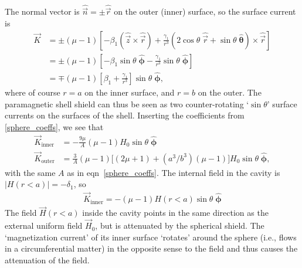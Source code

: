 The normal vector is $\hat{\vec n}=\pm\hat{\vec r}$ on the outer (inner)
surface, so the surface current is
%
\begin{align*}
   \vec K&=\pm(\mu-1)\left[-\beta_1\left(\hat{\vec z}\times\hat{\vec
   r}\right)+\frac{\gamma_1}{r^3}\left(2\cos\theta\;\hat{\vec
   r}+\sin\theta\;\hat{\boldsymbol\theta}\right)\times\hat{\vec r}\right]\\
   &=\pm(\mu-1)\left[-\beta_1\sin\theta\;\hat{\boldsymbol\phi}-\frac{\gamma_1}{r^3}\sin\theta\;\hat{\boldsymbol\phi}\right]\\
   &=\mp(\mu-1)\left[\beta_1+\frac{\gamma_1}{r^3}\right]\sin\theta\;\hat{\boldsymbol\phi},
\end{align*}
%
where of course $r=a$ on the inner surface, and $r=b$ on the outer. The
paramagnetic shell shield can thus be seen as two counter-rotating
`$\sin\theta$' surface currents on the surfaces of the shell. Inserting the
coefficients from \ref{sphere_coeffs}, we see that
\begin{equation}
   \label{sphere_currents}
   \begin{split}
      \vec
      K_\text{inner}&=-\frac{9\mu}{A}(\mu-1)H_0\sin\theta\;\hat{\boldsymbol\phi}\\
      \vec
      K_\text{outer}&=\frac{3}{A}(\mu-1)\big[(2\mu+1)+(a^3/b^3)(\mu-1)\big]H_0\sin\theta\;\hat{\boldsymbol\phi},
   \end{split}
\end{equation}
%
with the same $A$ as in eqn~\ref{sphere_coeffs}. The internal field in the
cavity is $|H(r<a)|=-\delta_1$, so
%
\begin{align*}
   \vec K_\text{inner}=-(\mu-1)H(r<a)\sin\theta\;\hat{\boldsymbol\phi}
\end{align*}
%
The field $\vec H(r<a)$ inside the cavity points in the same direction as the
external uniform field $\vec H_0$, but is attenuated by the spherical shield.
The `magnetization current' of its inner surface `rotates' around the sphere
(i.e., flows in a circumferential matter) in the opposite sense to the field and
thus causes the attenuation of the field. 

